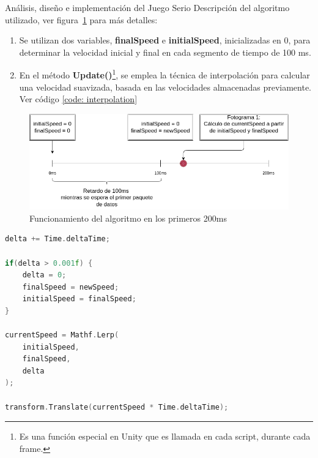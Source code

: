 \begin{thesischapter}{2} {Análisis, diseño e implementación del Juego Serio}
\vspace{10pt}
Descripción del algoritmo utilizado, ver figura~\ref{fig: interpolation-algorithm} para más detalles:
\begin{enumerate}
    \item Se utilizan dos variables, \textbf{finalSpeed} e \textbf{initialSpeed}, inicializadas en 0, para determinar la velocidad inicial y final en cada segmento de tiempo de 100 ms.
    \item En el método \textbf{Update()}\footnote{Es una función especial en Unity que es llamada en cada script, durante cada frame.}, se emplea la técnica de interpolación para calcular 
    una velocidad suavizada, basada en las velocidades almacenadas previamente. Ver código \ref{code: interpolation}
\end{enumerate} 

\begin{figure}[ht]
    \centering
    \includegraphics[scale=0.4]{images/interpolation-algorithm.png}
    \caption{Funcionamiento del algoritmo en los primeros 200ms}
    \label{fig: interpolation-algorithm}
\end{figure}

\begin{center}
\begin{minipage}{0.8\textwidth}
\begin{lstlisting}[language=c, label={code: interpolation}, caption={Controlador de movimiento}]
delta += Time.deltaTime;
 
if(delta > 0.001f) {
    delta = 0;
    finalSpeed = newSpeed;
    initialSpeed = finalSpeed;
}

currentSpeed = Mathf.Lerp( 
    initialSpeed, 
    finalSpeed, 
    delta
);

transform.Translate(currentSpeed * Time.deltaTime);
\end{lstlisting}
\end{minipage}
\end{center}



\end{thesischapter}
